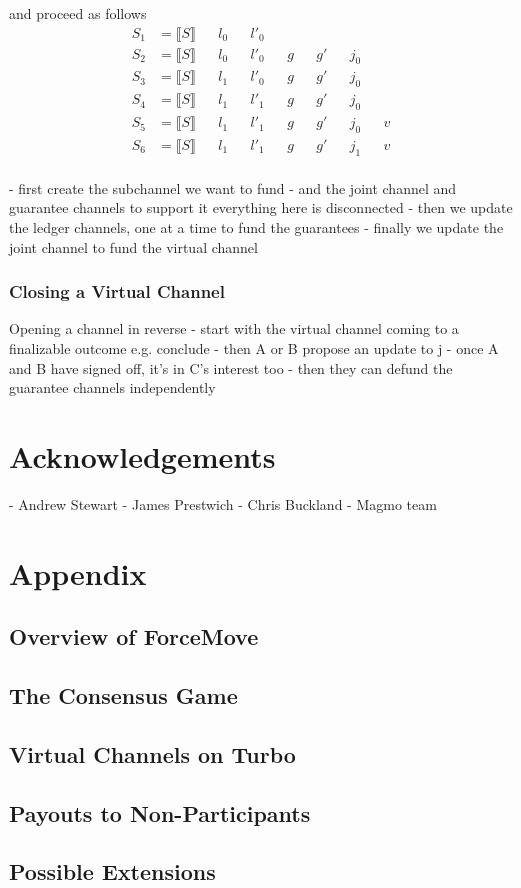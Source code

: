 \documentclass{article}
\theoremstyle{definition}
\newcommand{\adj}[1]{\llbracket #1 \rrbracket}
\begin{document}
and proceed as follows
\begin{align*}
S_1 &= \adj{S} && l_0 && l'_0 \\
S_2 &= \adj{S} && l_0 && l'_0 && g && g' && j_0 \\
S_3 &= \adj{S} && l_1 && l'_0 && g && g' && j_0 \\
S_4 &= \adj{S} && l_1 && l'_1 && g && g' && j_0 \\
S_5 &= \adj{S} && l_1 && l'_1 && g && g' && j_0 && v\\
S_6 &= \adj{S} && l_1 && l'_1 && g && g' && j_1 && v\\
\end{align*}

- first create the subchannel we want to fund
- and the joint channel and guarantee channels to support it
everything here is disconnected
- then we update the ledger channels, one at a time to fund the guarantees
- finally we update the joint channel to fund the virtual channel

\subsubsection{Closing a Virtual Channel}

Opening a channel in reverse
- start with the virtual channel coming to a finalizable outcome e.g. conclude
- then A or B propose an update to j
- once A and B have signed off, it's in C's interest too
- then they can defund the guarantee channels independently


\section{Acknowledgements}

- Andrew Stewart
- James Prestwich
- Chris Buckland
- Magmo team


\section{Appendix}

\subsection{Overview of ForceMove}
\subsection{The Consensus Game}
\subsection{Virtual Channels on Turbo}
\subsection{Payouts to Non-Participants}
\subsection{Possible Extensions}
\end{document}

